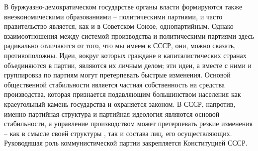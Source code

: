 \documentclass{book}
\begin{document}
В буржуазно-демократическом государстве органы власти формируются также внеэкономическими образованиями -- политическими партиями, и часто правительство является, как и в Советском Союзе, однопартийным. Однако взаимоотношения между системой производства и политическими партия­ми здесь радикально отличаются от того, что мы имеем в СССР, они, можно сказать, противоположны. Идеи, вокруг которых граждане в капиталистических странах объединяются в партии, являются их личным делом; эти идеи, а вместе с ними и группи­ровка по партиям могут претерпевать быстрые изменения. Основой общественной стабильности является частная собст­венность на средства производства, которая признается подав­ляющим большинством населения как краеугольный камень государства и охраняется законом. В СССР, напротив, именно партийная структура и партийная идеология являются основой стабильности, а управление производством может претерпе­вать резкие изменения -- как в смысле своей структуры , так и состава лиц, его осуществляющих. Руководящая 
роль комму­нистической партии закрепляется Конституцией СССР.
\end{document}
